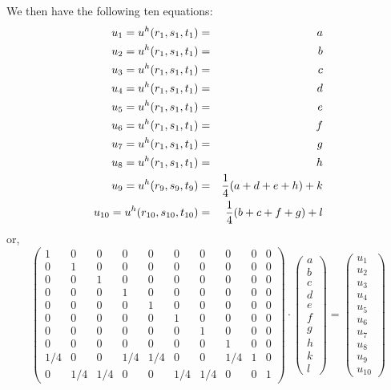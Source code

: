We then have the following ten equations:
\begin{eqnarray}
u_1=u^h(r_1,s_1,t_1) &=& a \nonumber \\
u_2=u^h(r_1,s_1,t_1) &=& b \nonumber \\
u_3=u^h(r_1,s_1,t_1) &=& c \nonumber \\
u_4=u^h(r_1,s_1,t_1) &=& d \nonumber \\
u_5=u^h(r_1,s_1,t_1) &=& e \nonumber \\
u_6=u^h(r_1,s_1,t_1) &=& f \nonumber \\
u_7=u^h(r_1,s_1,t_1) &=& g \nonumber \\
u_8=u^h(r_1,s_1,t_1) &=& h \nonumber \\
u_9=u^h(r_9,s_9,t_9) &=& \frac{1}{4}(a+d+e+h)+k \nonumber \\
u_{10}=u^h(r_{10},s_{10},t_{10}) &=& \frac{1}{4}(b+c+f+g)+l \nonumber
\end{eqnarray}
or, 
\[
\left(
\begin{array}{cccccccccc}
 1 & 0 & 0 & 0 & 0 & 0 & 0 & 0 & 0 & 0\\
 0 & 1 & 0 & 0 & 0 & 0 & 0 & 0 & 0 & 0\\
 0 & 0 & 1 & 0 & 0 & 0 & 0 & 0 & 0 & 0\\
 0 & 0 & 0 & 1 & 0 & 0 & 0 & 0 & 0 & 0\\
 0 & 0 & 0 & 0 & 1 & 0 & 0 & 0 & 0 & 0\\
 0 & 0 & 0 & 0 & 0 & 1 & 0 & 0 & 0 & 0\\
 0 & 0 & 0 & 0 & 0 & 0 & 1 & 0 & 0 & 0\\
 0 & 0 & 0 & 0 & 0 & 0 & 0 & 1 & 0 & 0\\
 1/4 & 0   & 0 & 1/4 & 1/4& 0   & 0 & 1/4 & 1 & 0\\
 0   & 1/4 & 1/4 & 0  &0 & 1/4 & 1/4 & 0 & 0 & 1
\end{array}
\right)
\cdot
\left(
\begin{array}{c}
a \\ b\\ c\\ d\\ e\\ f\\ g\\ h\\ k\\ l
\end{array}
\right)
=
\left(
\begin{array}{c}
u_1 \\ u_2 \\ u_3 \\ u_4 \\ u_5 \\ u_6 \\ u_7 \\ u_8 \\ u_9 \\ u_{10}
\end{array}
\right)
\]

